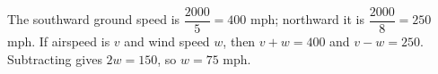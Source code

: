 The southward ground speed is $\dfrac{2000}{5}=400$ mph; northward it is $\dfrac{2000}{8}=250$ mph. If airspeed is $v$ and wind speed $w$, then $v+w=400$ and $v-w=250$. Subtracting gives $2w=150$, so $\boxed{w=75\text{ mph}}$.
